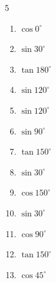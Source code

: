 \begin{multicols}{5}
\begin{enumerate}
  \item $\displaystyle \cos{0^\circ}$

        \phantom{$\displaystyle =1$}

  \item $\displaystyle \sin{30^\circ}$


  \item $\displaystyle \tan{180^\circ}$

        \phantom{$\displaystyle =0$}

  \item $\displaystyle \sin{120^\circ}$


  \item $\displaystyle \sin{120^\circ}$


\columnbreak %

  \item $\displaystyle \sin{90^\circ}$

        \phantom{$\displaystyle =1$}

  \item $\displaystyle \tan{150^\circ}$


  \item $\displaystyle \sin{30^\circ}$


  \item $\displaystyle \cos{150^\circ}$


  \item $\displaystyle \sin{30^\circ}$


  \item $\displaystyle \cos{90^\circ}$

        \phantom{$\displaystyle =0$}

  \item $\displaystyle \tan{150^\circ}$


  \item $\displaystyle \cos{45^\circ}$


\end{enumerate}
\end{multicols}
